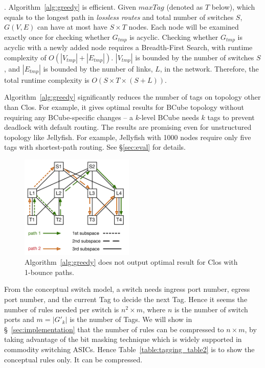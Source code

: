 . Algorithm~\ref{alg:greedy} is efficient. Given $maxTag$
(denoted as $T$ below), which equals to the longest path in {\em lossless routes} and
total number of switches $S$, $G(V,E)$ can have at most have $S \times T$ nodes.
Each node will be examined exactly once for checking whether $G_{tmp}$ is acyclic.
Checking whether $G_{tmp}$ is acyclic with a newly added node requires a Breadth-First Search,
with runtime complexity of $O(|V_{tmp}| + |E_{tmp}|)$. $|V_{tmp}|$ is bounded by the number
of switches $S$, and $|E_{tmp}|$ is bounded by the number of links, $L$, in the network.
Therefore, the total runtime complexity is $O(S \times T \times (S+L))$.

 Algorithm~\ref{alg:greedy} significantly reduces the
number of tags on topology other than Clos. For example, it gives optimal
results for BCube topology without requiring any BCube-specific changes -- a
$k$-level BCube needs $k$ tags to prevent deadlock with default routing. The
results are promising even for unstructured topology like Jellyfish.  For
example, Jellyfish with 1000 nodes require only five tags with shortest-path
routing. See \S\ref{sec:eval} for details.

\begin{figure}[t]
	\centering
	\includegraphics[width=0.48\textwidth] {figs/nonoptimal_example}
	\caption{Algorithm~\ref{alg:greedy} does not output optimal result for Clos with 1-bounce paths.}
	\label{fig:nonoptimal}
\end{figure}

From the conceptual switch model, a switch needs ingress port number, egress port number, and the current Tag 
to decide the next Tag. Hence it seems the number of rules needed per switch is $n^2\times m$, where $n$ is 
the number of switch ports and $m=|G'_{k}|$ is the number of Tags. We will show in \S~\ref{sec:implementation} that the 
number of rules can be compressed to $n\times m$, by taking advantage of the bit masking technique which is 
widely supported in commodity switching ASICs. Hence Table~\ref{table:tagging_table2} is to show the 
conceptual rules only. It can be compressed.

